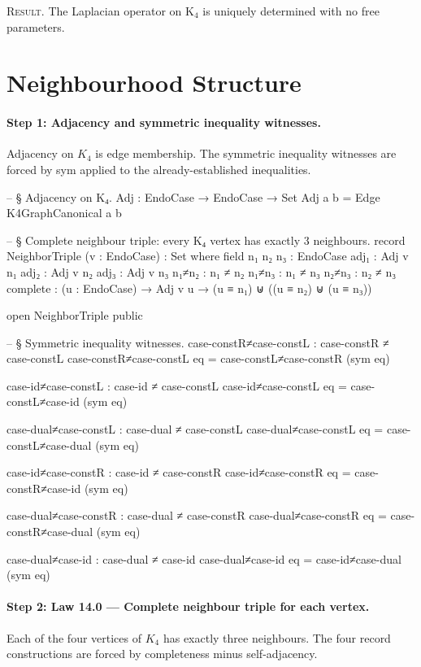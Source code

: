 \documentclass[11pt,a4paper]{book}
\def\texttt#1{#1}%
\begin{document}
\textsc{Result.}
The Laplacian operator on K$_4$ is uniquely determined with no free parameters.

\section{Neighbourhood Structure}

\paragraph{Step 1: Adjacency and symmetric inequality witnesses.}
Adjacency on $K_4$ is edge membership.
The symmetric inequality witnesses are forced by \texttt{sym} applied to the already-established inequalities.

\begin{code}
-- § Adjacency on K₄.
Adj : EndoCase → EndoCase → Set
Adj a b = Edge K4GraphCanonical a b

-- § Complete neighbour triple: every K₄ vertex has exactly 3 neighbours.
record NeighborTriple (v : EndoCase) : Set where
  field
    n₁ n₂ n₃ : EndoCase
    adj₁     : Adj v n₁
    adj₂     : Adj v n₂
    adj₃     : Adj v n₃
    n₁≠n₂     : n₁ ≠ n₂
    n₁≠n₃     : n₁ ≠ n₃
    n₂≠n₃     : n₂ ≠ n₃
    complete : (u : EndoCase) → Adj v u → (u ≡ n₁) ⊎ ((u ≡ n₂) ⊎ (u ≡ n₃))

open NeighborTriple public

-- § Symmetric inequality witnesses.
case-constR≠case-constL : case-constR ≠ case-constL
case-constR≠case-constL eq = case-constL≠case-constR (sym eq)

case-id≠case-constL : case-id ≠ case-constL
case-id≠case-constL eq = case-constL≠case-id (sym eq)

case-dual≠case-constL : case-dual ≠ case-constL
case-dual≠case-constL eq = case-constL≠case-dual (sym eq)

case-id≠case-constR : case-id ≠ case-constR
case-id≠case-constR eq = case-constR≠case-id (sym eq)

case-dual≠case-constR : case-dual ≠ case-constR
case-dual≠case-constR eq = case-constR≠case-dual (sym eq)

case-dual≠case-id : case-dual ≠ case-id
case-dual≠case-id eq = case-id≠case-dual (sym eq)
\end{code}

\paragraph{Step 2: Law 14.0 --- Complete neighbour triple for each vertex.}
Each of the four vertices of $K_4$ has exactly three neighbours. The four record constructions
are forced by completeness minus self-adjacency.
\end{document}
